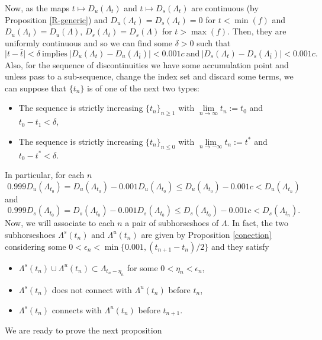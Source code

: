 \documentclass[12pt]{amsart}
\providecommand{\abs}[1]{\lvert#1\rvert}
\newcommand{\infinity}{\infty}
\theoremstyle{plain} %
\theoremstyle{definition} %
\numberwithin{equation}{section}
\begin{document}
Now, as the maps $t \mapsto D_u(\Lambda_{t})$ and $t \mapsto D_s(\Lambda_{t})$ are continuous (by Proposition \ref{R-generic}) and $D_u(\Lambda_{t})=D_s(\Lambda_{t})=0$ for $t<\min (f)$ and $D_u(\Lambda_{t})=D_u(\Lambda)$,  $D_s(\Lambda_{t})=D_s(\Lambda)$ for $t>\max (f)$. Then, they are uniformly continuous and so we can find some $\delta >0$ such that 
$$\abs{t-\bar{t}}<\delta\  \mbox{implies}\ \abs{D_u(\Lambda_{t})-D_u(\Lambda_{\bar{t}})} < 0.001c\  \mbox{and}\ \abs{D_s(\Lambda_{t})-D_s(\Lambda_{\bar{t}})}< 0.001c.$$
Also, for the sequence of discontinuities we have some accumulation point and unless pass to a sub-sequence, change the index set and discard some terms, we can suppose that $\{ t_n\}$ is of one of the next two types:
\begin{itemize}
    \item The sequence is strictly increasing $\{t_n\}_{n\geq 1}$ with $\lim \limits_{n\rightarrow \infinity}t_n:=t_0$ and $t_0-t_1<\delta$,
    \item The sequence is strictly increasing $\{t_n\}_{n\leq 0}$ with $\lim \limits_{n\rightarrow -\infinity}t_n:=t^*$ and $t_0-t^*<\delta.$
    \end{itemize}

In particular, for each $n$
\begin{equation}\label{estima0}
 0.999D_u(\Lambda_{t_0})=D_u(\Lambda_{t_0})- 0.001D_u(\Lambda_{t_0})\leq D_u(\Lambda_{t_0})- 0.001c<D_u(\Lambda_{t_n})  
\end{equation} 
and 
\begin{equation}\label{estima00}
 0.999D_s(\Lambda_{t_0})=D_s(\Lambda_{t_0})- 0.001D_s(\Lambda_{t_0})\leq D_s(\Lambda_{t_0})- 0.001c<D_s(\Lambda_{t_n}).  
\end{equation} 
Now, we will associate to each $n$ a pair of subhorseshoes of $\Lambda$. In fact, the two subhorseshoes $\Lambda^s(t_n)$ and $\Lambda^u(t_n)$ are given by Proposition \ref{conection} considering some $0<\epsilon_n< \min \{0.001,(t_{n+1}-t_n)/2\}$ and they satisfy 

\begin{itemize}
     \item $\Lambda^s(t_n)\cup \Lambda^u(t_n) \subset \Lambda_{t_n-{\eta_n}}$ for some $0<\eta_n<\epsilon_n$,
     \item $\Lambda^s(t_n)$ does not connect with $\Lambda^u(t_n)$ before $t_n$,
     \item $\Lambda^s(t_n)$ connects with $\Lambda^u(t_n)$ before $t_{n+1}$.
 \end{itemize} 
We are ready to prove the next proposition
  
\end{document}
